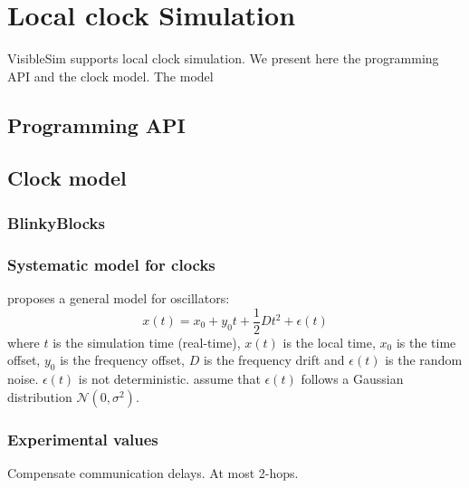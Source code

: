\documentclass[11pt]{article}
\begin{document}
\section{Local clock Simulation}

VisibleSim supports local clock simulation. We present here the programming API and the clock model. The model

\subsection{Programming API}

\subsection{Clock model}

\subsubsection{BlinkyBlocks}

\subsubsection{Systematic model for clocks}

\cite{allan1987time} proposes a general model for oscillators:
\begin{equation}
x(t) = x_0 + y_0t + \frac{1}{2}Dt^2 + \epsilon(t)
\end{equation}
where $t$ is the simulation time (real-time), $x(t)$ is the local time, $x_0$ is the time offset, $y_0$ is the frequency offset, $D$ is the frequency drift and $\epsilon(t)$ is the random noise. $\epsilon(t)$ is not deterministic. \cite{ma2007understanding} assume that $\epsilon(t)$ follows a Gaussian distribution $\mathcal{N}(0,\sigma^2)$. 

\subsubsection{Experimental values}

Compensate communication delays.
At most 2-hops.
\end{document}
